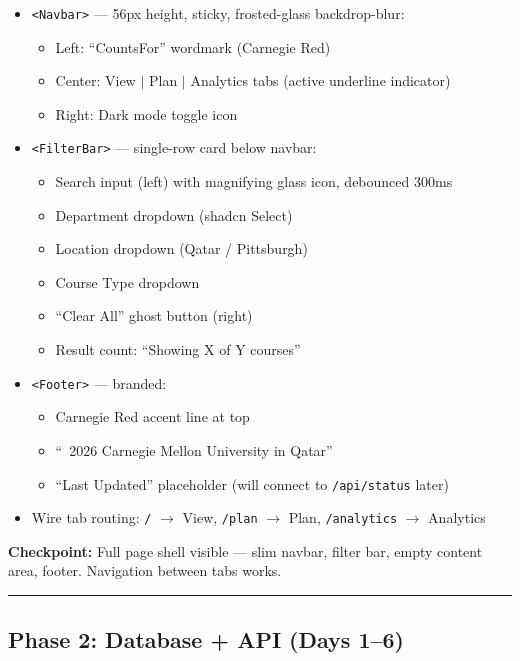 \documentclass[11pt]{article}
\begin{document}
\begin{itemize}[leftmargin=2em]
    \item \texttt{<Navbar>} — 56px height, sticky, frosted-glass backdrop-blur:
    \begin{itemize}
        \item Left: ``CountsFor'' wordmark (Carnegie Red)
        \item Center: View $|$ Plan $|$ Analytics tabs (active underline indicator)
        \item Right: Dark mode toggle icon
    \end{itemize}
    \item \texttt{<FilterBar>} — single-row card below navbar:
    \begin{itemize}
        \item Search input (left) with magnifying glass icon, debounced 300ms
        \item Department dropdown (shadcn Select)
        \item Location dropdown (Qatar / Pittsburgh)
        \item Course Type dropdown
        \item ``Clear All'' ghost button (right)
        \item Result count: ``Showing X of Y courses''
    \end{itemize}
    \item \texttt{<Footer>} — branded:
    \begin{itemize}
        \item Carnegie Red accent line at top
        \item ``\textcopyright\ 2026 Carnegie Mellon University in Qatar''
        \item ``Last Updated'' placeholder (will connect to \texttt{/api/status} later)
    \end{itemize}
    \item Wire tab routing: \texttt{/} $\rightarrow$ View, \texttt{/plan} $\rightarrow$ Plan, \texttt{/analytics} $\rightarrow$ Analytics
\end{itemize}

\noindent
\textbf{Checkpoint:} Full page shell visible — slim navbar, filter bar, empty content area, footer. Navigation between tabs works.

\noindent\rule{\textwidth}{0.2pt}

\subsection{Phase 2: Database + API (Days 1--6)}
\end{document}
